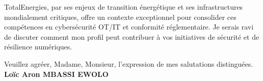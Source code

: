 \documentclass[a4paper,11pt]{article}
\begin{document}
\vspace{0.8em}
\noindent TotalEnergies, par ses enjeux de transition énergétique et ses infrastructures mondialement critiques, offre un contexte exceptionnel pour consolider ces compétences en cybersécurité OT/IT et conformité réglementaire. Je serais ravi de discuter comment mon profil peut contribuer à vos initiatives de sécurité et de résilience numériques.

\vspace{1.5em}
\noindent Veuillez agr\'eer, Madame, Monsieur, l'expression de mes salutations distingu\'ees.
\vspace{2em}
\noindent \textbf{Lo\"ic Aron MBASSI EWOLO}
\end{document}
